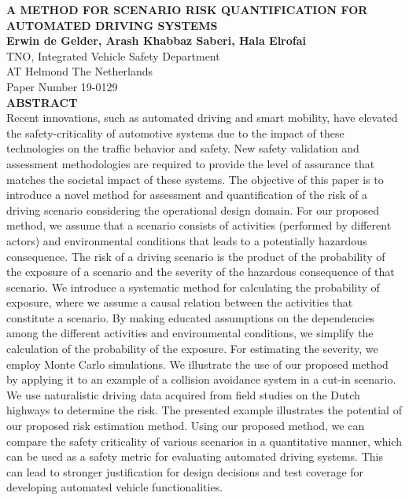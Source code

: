 \documentclass[10pt,final,letterpaper,oneside,onecolumn]{article}
\begin{document}
\noindent \MakeTextUppercase{\textbf{\large{A Method for Scenario Risk Quantification for Automated Driving Systems}}}\\

\noindent \textbf{Erwin de Gelder, Arash Khabbaz Saberi, Hala Elrofai}\\
\noindent TNO, Integrated Vehicle Safety Department\\
 AT Helmond The Netherlands\\

\noindent Paper Number 19-0129\\

\noindent \textbf{\large{ABSTRACT}}\\

\noindent Recent innovations, such as automated driving and smart mobility, have elevated the safety-criticality of automotive systems due to the impact of these technologies on the traffic behavior and safety. New safety validation and assessment methodologies are required to provide the level of assurance that matches the societal impact of these systems.
The objective of this paper is to introduce a novel method for assessment and quantification of the risk of a driving scenario considering the operational design domain. 
For our proposed method, we assume that a scenario consists of activities (performed by different actors) and environmental conditions that leads to a potentially hazardous consequence.
The risk of a driving scenario is the product of the probability of the exposure of a scenario and the severity of the hazardous consequence of that scenario.
We introduce a systematic method for calculating the probability of exposure, 
where we assume a causal relation between the activities that constitute a scenario. 
By making educated assumptions on the dependencies among the different activities and environmental conditions, 
we simplify the calculation of the probability of the exposure. 
For estimating the severity, we employ Monte Carlo simulations.
We illustrate the use of our proposed method by applying it to an example of a collision avoidance system in a cut-in scenario.	
We use naturalistic driving data acquired from field studies on the Dutch highways to determine the risk. 
The presented example illustrates the potential of our proposed risk estimation method. 
Using our proposed method, we can compare the safety criticality of various scenarios in a quantitative manner, which can be used as a safety metric for evaluating automated driving systems. 
This can lead to stronger justification for design decisions and test coverage for developing automated vehicle functionalities.


\pagebreak







\printbibliography[title=\hspace{7.5pt} References]
\end{document}
